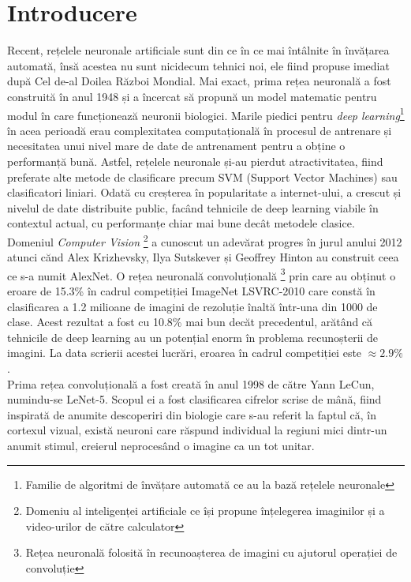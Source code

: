 \section{Introducere}
Recent, rețelele neuronale artificiale sunt din ce în ce mai întâlnite în învățarea automată, însă acestea nu sunt nicidecum tehnici noi, ele fiind propuse imediat după Cel de-al Doilea Război Mondial. Mai exact, prima rețea neuronală a fost construită în anul 1948 și a încercat să propună un model matematic pentru modul în care funcționează neuronii biologici. Marile piedici pentru \textit{deep learning}\footnote{Familie de algoritmi de învățare automată ce au la bază rețelele neuronale} în acea perioadă erau complexitatea computațională în procesul de antrenare și necesitatea unui nivel mare de date de antrenament pentru a obține o performanță bună. Astfel, rețelele neuronale și-au pierdut atractivitatea, fiind preferate alte metode de clasificare precum SVM (Support Vector Machines) sau clasificatori liniari. Odată cu creșterea în popularitate a internet-ului, a crescut și nivelul de date distribuite public, facând tehnicile de deep learning viabile în contextul actual, cu performanțe chiar mai bune decât metodele clasice.\\

Domeniul \textit{Computer Vision} \footnote{Domeniu al inteligenței artificiale ce își propune înțelegerea imaginilor și a video-urilor de către calculator} a cunoscut un adevărat progres în jurul anului 2012 atunci cănd Alex Krizhevsky, Ilya Sutskever și Geoffrey Hinton au construit ceea ce s-a numit AlexNet.\cite{alexnet} O rețea neuronală convoluțională \footnote{Rețea neuronală folosită în recunoașterea de imagini cu ajutorul operației de convoluție} prin care au obținut o eroare de 15.3\% în cadrul competiției ImageNet LSVRC-2010 care constă în clasificarea a 1.2 milioane de imagini de rezoluție înaltă într-una din 1000 de clase. Acest rezultat a fost cu 10.8\% mai bun decăt precedentul, arătând că tehnicile de deep learning au un potențial enorm în problema recunoșterii de imagini. La data scrierii acestei lucrări, eroarea în cadrul competiției este $\approx 2.9\%$.\\

Prima rețea convoluțională a fost creată în anul 1998 de către Yann LeCun, numindu-se LeNet-5.   \cite{lenet} Scopul ei a fost clasificarea cifrelor scrise de mână, fiind inspirată de anumite descoperiri din biologie care s-au referit la faptul că, în cortexul vizual, există neuroni care răspund individual la regiuni mici dintr-un anumit stimul, creierul neprocesând o imagine ca un tot unitar. \\

